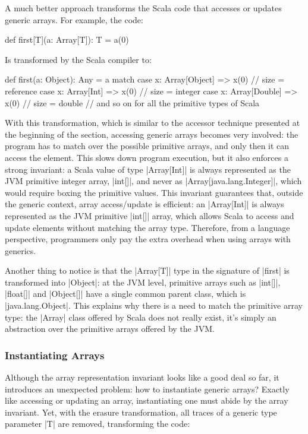 A much better approach transforms the Scala code that accesses or updates generic arrays. For example, the code:

\begin{lstlisting-nobreak}
 def first[T](a: Array[T]): T = a(0)
\end{lstlisting-nobreak}

Is transformed by the Scala compiler to:

\begin{lstlisting-nobreak}
 def first(a: Object): Any =
   a match {
     case x: Array[Object] => x(0) // size = reference
     case x: Array[Int]    => x(0)           // size = integer
     case x: Array[Double] => x(0) // size = double
     // and so on for all the primitive types of Scala
   }
\end{lstlisting-nobreak}


With this transformation, which is similar to the accessor technique presented at the beginning of the section, accessing generic arrays becomes very involved: the program has to match over the possible primitive arrays, and only then it can access the element. This slows down program execution, but it also enforces a strong invariant: a Scala value of type |Array[Int]| is always represented as the JVM primitive integer array, |int[]|, and never as |Array[java.lang.Integer]|, which would require boxing the primitive values. This invariant guarantees that, outside the generic context, array access/update is efficient: an |Array[Int]| is always represented as the JVM primitive |int[]| array, which allows Scala to access and update elements without matching the array type. Therefore, from a language perspective, programmers only pay the extra overhead when using arrays with generics.

Another thing to notice is that the |Array[T]| type in the signature of |first| is transformed into |Object|: at the JVM level, primitive arrays such as |int[]|, |float[]| and |Object[]| have a single common parent class, which is |java.lang.Object|. This explains why there is a need to match the primitive array type: the |Array| class offered by Scala does not really exist, it's simply an abstraction over the primitive arrays offered by the JVM.

\subsubsection{Instantiating Arrays}

Although the array representation invariant looks like a good deal so far, it introduces an unexpected problem: how to instantiate generic arrays? Exactly like accessing or updating an array, instantiating one must abide by the array invariant. Yet, with the erasure transformation, all traces of a generic type parameter |T| are removed, transforming the code:

